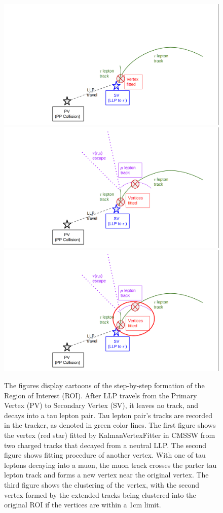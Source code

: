 \begin{figure}[h!]
  \centering
  \includegraphics[width=0.65\linewidth]{figs/ROICT1.png}
  \includegraphics[width=0.65\linewidth]{figs/ROICT2.png}
  \includegraphics[width=0.65\linewidth]{figs/ROICT3.png}
\caption{
        The figures display cartoons of the step-by-step formation of the Region of Interest (ROI).
	After LLP travels from the Primary Vertex (PV) to Secondary Vertex (SV), it leaves no track, and decays into a tau lepton pair.
	Tau lepton pair's tracks are recorded in the tracker, as denoted in green color lines.
	The first figure shows the vertex (red star) fitted by KalmanVertexFitter in CMSSW from two charged tracks that decayed from a neutral LLP.
        The second figure shows fitting procedure of another vertex. With one of tau leptons decaying into a muon, the muon track crosses the parter tau lepton track and forms a new vertex near the original vertex.
	The third figure shows the clustering of the vertex, with the second vertex formed by the extended tracks being clustered into the original ROI if the vertices are within a 1cm limit.
	}
  \label{fig:Clustering}
\end{figure}

